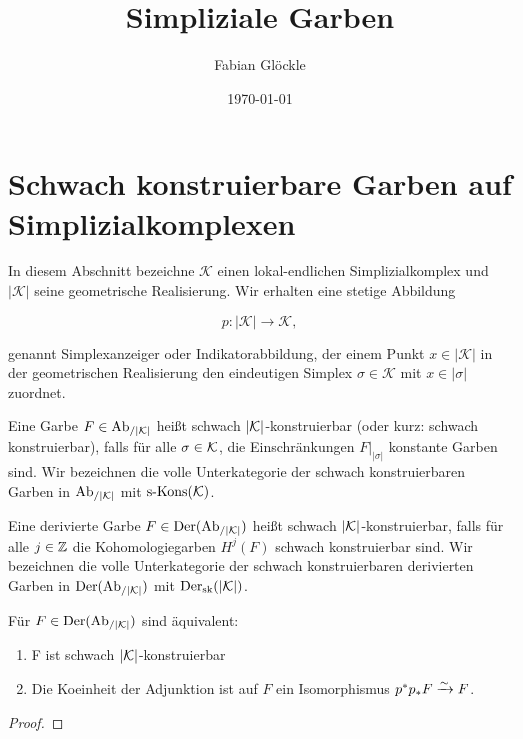 



\title{Simpliziale Garben}
\author{Fabian Glöckle}
\date{\today}

\section{Schwach konstruierbare Garben auf Simplizialkomplexen}

In diesem Abschnitt bezeichne $\mathcal{K}$ einen lokal-endlichen
Simplizialkomplex und $|\mathcal{K}|$ seine geometrische
Realisierung. Wir erhalten eine stetige Abbildung

\[ p: |\mathcal{K}| \to \mathcal{K}, \]

genannt Simplexanzeiger oder Indikatorabbildung, der einem Punkt $x
\in |\mathcal{K}|$ in der geometrischen Realisierung den eindeutigen
Simplex $\sigma \in \mathcal{K}$ mit $x \in |\sigma|$ zuordnet.


\begin{defn}
  Eine Garbe $F \in \operatorname{Ab}_{/|\mathcal{K}|}$ heißt schwach $|\mathcal{K}|$-konstruierbar (oder
  kurz: schwach konstruierbar), falls für alle $\sigma \in \mathcal{K}$, die
  Einschränkungen $F|_{|\sigma|}$ konstante Garben sind. Wir
  bezeichnen die volle Unterkategorie der schwach konstruierbaren
  Garben in $\operatorname{Ab}_{/|\mathcal{K}|}$ mit $\operatorname{s-Kons}(\mathcal{K})$.

  Eine derivierte Garbe $F \in \operatorname{Der}(\operatorname{Ab}_{/|\mathcal{K}|})$ heißt schwach
  $|\mathcal{K}|$-konstruierbar, falls für alle $j \in \mathbb{Z}$ die
  Kohomologiegarben $H^j(F)$ schwach konstruierbar sind. Wir
  bezeichnen die volle Unterkategorie der schwach konstruierbaren
  derivierten Garben in $\operatorname{Der}(\operatorname{Ab}_{/|\mathcal{K}|})$ mit $\operatorname{Der}_{\mathrm{sk}}(|\mathcal{K}|)$.
\end{defn}



\begin{prop}
  Für $F \in \operatorname{Der}(\operatorname{Ab}_{/|\mathcal{K}|})$ sind äquivalent:
  \begin{enumerate}
  \item F ist schwach $|\mathcal{K}|$-konstruierbar
  \item Die Koeinheit der Adjunktion ist auf $F$ ein Isomorphismus
    $p^*p_*F \xrightarrow{\sim} F$.
  \end{enumerate}
\end{prop}
\begin{proof}
\end{proof}

